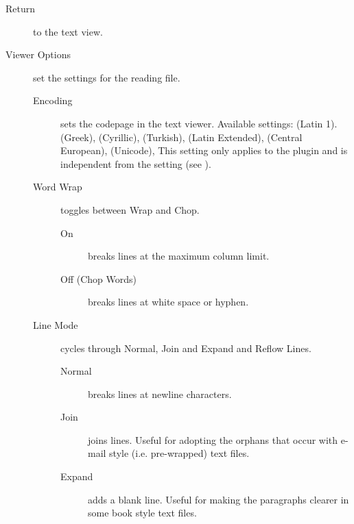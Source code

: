 \begin{description}
\item[Return] to the text view.
\item[Viewer Options] set the settings for the reading file.
    \begin{description}
    \item[Encoding]
    sets the codepage in the text viewer.
    Available settings:
     (Latin 1).
     (Greek),
     (Cyrillic),
     (Turkish),
     (Latin Extended),
     (Central European),
     (Unicode),
    This setting only applies to the plugin and is independent from the
     setting (see ).
    \item[Word Wrap] toggles between Wrap and Chop.
        \begin{description}
            \item[On] breaks lines at the maximum column limit.
            \item[Off (Chop Words)] breaks lines at white space or hyphen.
        \end{description}
    \item[Line Mode] cycles through Normal, Join and Expand and Reflow Lines.
        \begin{description}
            \item[Normal] breaks lines at newline characters.
            \item[Join] joins lines. Useful for adopting the orphans that
            occur with e{}-mail style (i.e. pre{}-wrapped) text files.
            \item[Expand] adds a blank line. Useful for making the paragraphs
            clearer in some book style text files.
        \end{description}

\end{description}
\end{description}
